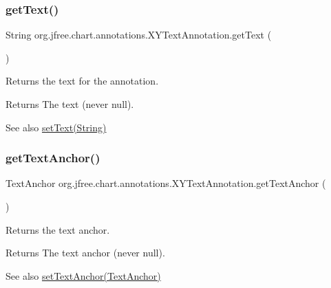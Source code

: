 \subsubsection{\texorpdfstring{get\+Text()}{getText()}}
{\footnotesize\ttfamily String org.\+jfree.\+chart.\+annotations.\+X\+Y\+Text\+Annotation.\+get\+Text (\begin{DoxyParamCaption}{ }\end{DoxyParamCaption})}

Returns the text for the annotation.

\begin{DoxyReturn}{Returns}
The text (never {\ttfamily null}).
\end{DoxyReturn}
\begin{DoxySeeAlso}{See also}
\mbox{\hyperlink{classorg_1_1jfree_1_1chart_1_1annotations_1_1_x_y_text_annotation_af3608173d547a1126eed296b66a645fc}{set\+Text(\+String)}} 
\end{DoxySeeAlso}
\mbox{\label{classorg_1_1jfree_1_1chart_1_1annotations_1_1_x_y_text_annotation_a16ea6d9986cc6a441441edb006bc6347}} 
\subsubsection{\texorpdfstring{get\+Text\+Anchor()}{getTextAnchor()}}
{\footnotesize\ttfamily Text\+Anchor org.\+jfree.\+chart.\+annotations.\+X\+Y\+Text\+Annotation.\+get\+Text\+Anchor (\begin{DoxyParamCaption}{ }\end{DoxyParamCaption})}

Returns the text anchor.

\begin{DoxyReturn}{Returns}
The text anchor (never {\ttfamily null}).
\end{DoxyReturn}
\begin{DoxySeeAlso}{See also}
\mbox{\hyperlink{classorg_1_1jfree_1_1chart_1_1annotations_1_1_x_y_text_annotation_a8f94034b11e63a57a792df1c26c03436}{set\+Text\+Anchor(\+Text\+Anchor)}} 
\end{DoxySeeAlso}
\mbox{\label{classorg_1_1jfree_1_1chart_1_1annotations_1_1_x_y_text_annotation_a3d6dc594808c4088b31015658bd7c4f6}} 
